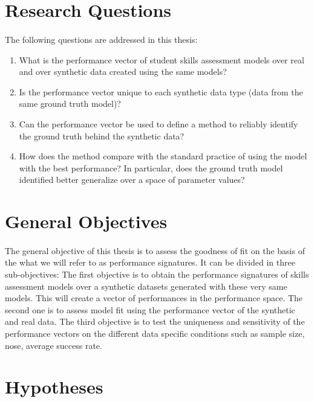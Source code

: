 \section{Research Questions}
\paragraph{}The following questions are addressed in this thesis:

\begin{enumerate}
\item What is the performance vector of student skills assessment models over real and over synthetic data created using the same models?
\item Is the performance vector unique to each synthetic data type (data from the same ground truth model)?
\item Can the performance vector be used to define a method to reliably identify the ground truth behind the synthetic data?
\item How does the method compare with the standard practice of using the model with the best performance?  In particular, does the ground truth model identified better generalize over a space of parameter values?
\end{enumerate}


\section{General Objectives}

\paragraph{}The general objective of this thesis is to assess the goodness of fit on the basis of the what we will refer to as performance signatures. It can be divided in three sub-objectives: The first objective is to obtain the performance signatures of skills assessment models over a synthetic datasets generated with these very same models. This will create a vector of performances in the performance space. The second one is to assess model fit using the performance vector of the synthetic and real data. The third objective is to test the uniqueness and sensitivity of the performance vectors on the different data specific conditions such as sample size, nose, average success rate.

\section{Hypotheses}
